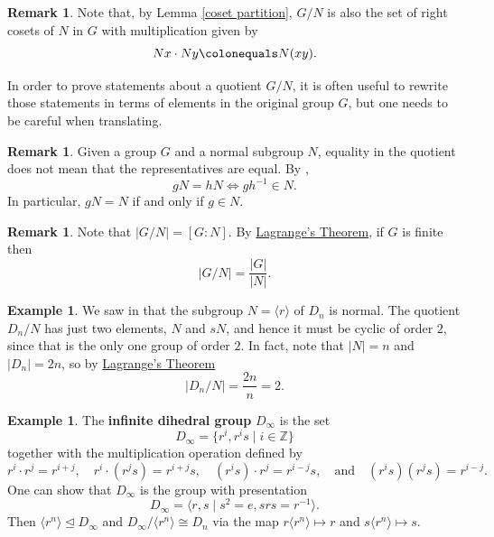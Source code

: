 \documentclass[12pt]{report}
\numberwithin{equation}{section}
\numberwithin{theorem}{chapter}
\theoremstyle{definition}
\newtheorem{example}[theorem]{Example}
\newtheorem*{basic properties}{Basic Properties}
\newtheorem*{Important Remark}{Important Remark}
\newtheorem{remark}[theorem]{Remark}
\newcommand{\df}[1]{{\bf #1}\index{#1}}
\newcommand{\Z}{\mathbb{Z}}
\def\norm{\mathrel{\unlhd}}
\begin{document}
\begin{remark}
	Note that, by  Lemma \ref{coset partition}, $G/N$ is also the set of right  cosets of $N$ in $G$ with multiplication given by 
	$$Nx\cdot Ny \colonequals N(xy).$$
\end{remark}


In order to prove statements about a quotient $G/N$, it is often useful to rewrite those statements in terms of elements in the original group $G$, but one needs to be careful when translating.

\begin{remark}
	Given a group $G$ and a normal subgroup $N$, equality in the quotient does not mean that the representatives are equal. By , 
	$$gN = hN \iff gh^{-1} \in N.$$ 
	In particular, $gN = N$ if and only if $g \in N$.
\end{remark}





\begin{remark}\label{order of quotient}
Note that $|G/N| = [G :N ]$. By \hyperref[Lagrange]{Lagrange's Theorem}, if $G$ is finite then
$$\left | G/N\right | = \frac{|G|}{|N|}.$$
\end{remark}




\begin{example}\label{example quotient of D_n by rotations}
We saw in  that the subgroup $N = \langle r \rangle$ of $D_{n}$ is normal. The quotient $D_{n}/N$ has just two elements, $N$ and $sN$, and hence it must be cyclic of order $2$, since that is the only one group of order $2$. In fact, note that $|N| = n$ and $|D_n| = 2n$, so by \hyperref[Lagrange]{Lagrange's Theorem} 
$$|D_n/N| = \frac{2n}{n} =2.$$
\end{example}




\begin{example}\label{example D_infty}
	The \df{infinite dihedral group} $D_\infty$ is the set 
	$$D_\infty = \{r^i,r^is \mid i \in \Z\}$$ 
	together with the multiplication operation defined by 
	$$r^i \cdot r^j = r^{i+j}, \quad r^i \cdot (r^js) = r^{i+j}s, \quad (r^is) \cdot r^j = r^{i-j}s, \quad \textrm{and} \quad (r^is)(r^js) = r^{i-j}.$$
One can show that $D_\infty$ is the group with presentation
$$D_\infty=\langle r,s \mid s^2=e, srs=r^{-1}\rangle.$$
Then $\langle r^n \rangle \norm D_\infty$ and $D_\infty/ \langle r^n \rangle \cong D_{n}$ via the map $r\langle r^n \rangle\mapsto r$ and $s\langle r^n \rangle\mapsto s$.
\end{example}
\end{document}

